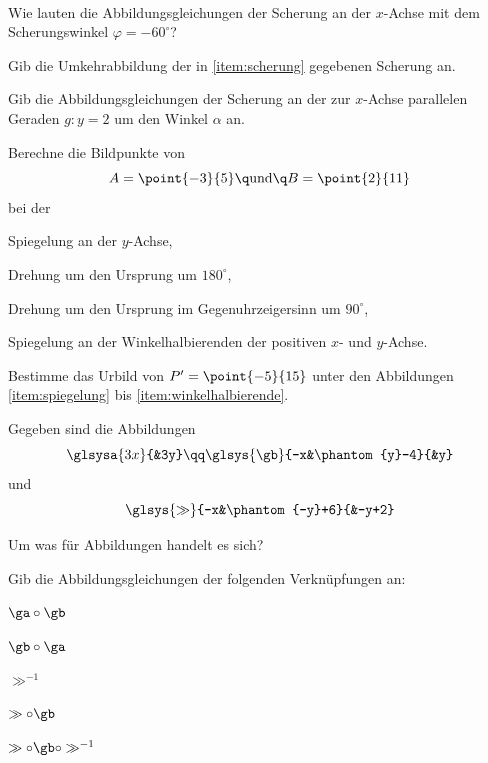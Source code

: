 \documentclass[%
11pt,%
twoside,%
titlepage,%
german,%
headsepline%
]{scrartcl}
\begin{document}
\begin{ueb}
\ \\[-4ex]
\begin{enumeratea}
\item\label{item:scherung} Wie lauten die Abbildungsgleichungen der Scherung an der $x$-Achse mit dem Scherungswinkel $\varphi = -60^\circ$?
\item Gib die Umkehrabbildung der in \eqref{item:scherung} gegebenen Scherung an.
\item Gib die Abbildungsgleichungen der Scherung an der zur $x$-Achse parallelen Geraden $g:y=2$ um den Winkel $\alpha$ an.
\end{enumeratea}
\end{ueb}

\begin{ueb}
Berechne die Bildpunkte von
$$A = \point{-3}{5}\q\text{und}\q B = \point{2}{11}$$
bei der
\begin{enumeratea}
\item\label{item:spiegelung} Spiegelung an der $y$-Achse,
\item Drehung um den Ursprung um $180^\circ$,
\item Drehung um den Ursprung im Gegenuhrzeigersinn um $90^\circ$,
\item\label{item:winkelhalbierende} Spiegelung an der Winkelhalbierenden der positiven $x$- und $y$-Achse.
\item Bestimme das Urbild von $P' = \point{-5}{15}$ unter den Abbildungen \eqref{item:spiegelung} bis \eqref{item:winkelhalbierende}.
\end{enumeratea}
\end{ueb}

\begin{ueb}\label{ueb:verketten}
Gegeben sind die Abbildungen
$$\glsysa{3x}{&3y}\qq\glsys{\gb}{-x&\phantom{y}-4}{&y}$$
und
$$\glsys{\gg}{-x&\phantom{-y}+6}{&-y+2}$$
\begin{enumeratea}
\item Um was für Abbildungen handelt es sich?
\item Gib die Abbildungsgleichungen der folgenden Verknüpfungen an:
\begin{enumeratei}
\item $\ga\circ\gb$
\item $\gb\circ\ga$
\item $\gg^{-1}$
\item $\gg\circ\gb$
\item $\gg\circ\gb\circ\gg^{-1}$
\end{enumeratei}
\end{enumeratea}
\end{ueb}
\end{document}
